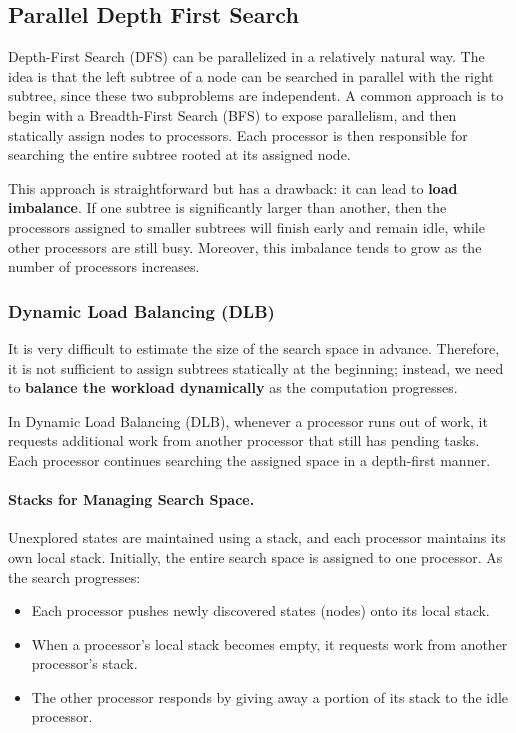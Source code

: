 \documentclass[12pt]{book}
\begin{document}
\subsection{Parallel Depth First Search}
Depth-First Search (DFS) can be parallelized in a relatively natural way. The idea is that the left subtree of a node can be searched in parallel with the right subtree, since these two subproblems are independent. A common approach is to begin with a Breadth-First Search (BFS) to expose parallelism, and then statically assign nodes to processors. Each processor is then responsible for searching the entire subtree rooted at its assigned node.  

This approach is straightforward but has a drawback: it can lead to \textbf{load imbalance}. If one subtree is significantly larger than another, then the processors assigned to smaller subtrees will finish early and remain idle, while other processors are still busy. Moreover, this imbalance tends to grow as the number of processors increases.

\subsubsection{Dynamic Load Balancing (DLB)}
It is very difficult to estimate the size of the search space in advance. Therefore, it is not sufficient to assign subtrees statically at the beginning; instead, we need to \textbf{balance the workload dynamically} as the computation progresses.  

In Dynamic Load Balancing (DLB), whenever a processor runs out of work, it requests additional work from another processor that still has pending tasks. Each processor continues searching the assigned space in a depth-first manner.  

\paragraph{Stacks for Managing Search Space.}  
Unexplored states are maintained using a stack, and each processor maintains its own local stack. Initially, the entire search space is assigned to one processor. As the search progresses:
\begin{itemize}
    \item Each processor pushes newly discovered states (nodes) onto its local stack.
    \item When a processor’s local stack becomes empty, it requests work from another processor’s stack.
    \item The other processor responds by giving away a portion of its stack to the idle processor.
\end{itemize}
\end{document}
